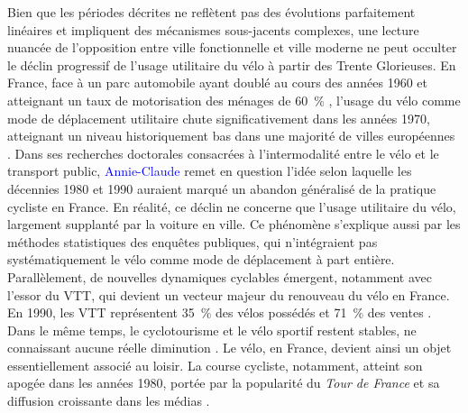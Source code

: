 \begin{refsegment}
Bien que les périodes décrites ne reflètent pas des évolutions parfaitement linéaires et impliquent des mécanismes sous-jacents complexes, une lecture nuancée de l’opposition entre ville fonctionnelle et ville moderne ne peut occulter le déclin progressif de l’usage utilitaire du vélo à partir des Trente Glorieuses. En France, face à un parc automobile ayant doublé au cours des années 1960 et atteignant un taux de motorisation des ménages de 60~\% \textcolor{blue}{\autocite[43]{flonneau_georges_1999}}, l’usage du vélo comme mode de déplacement utilitaire chute significativement dans les années 1970, atteignant un niveau historiquement bas dans une majorité de villes européennes \textcolor{blue}{\autocite[41]{eskenazi_voir_2022}}. Dans ses recherches doctorales consacrées à l’intermodalité entre le vélo et le transport public, \textcolor{blue}{Annie-Claude} \textcolor{blue}{\textcite[53]{sebban_complementarite_2003}} remet en question l’idée selon laquelle les décennies 1980 et 1990 auraient marqué un abandon généralisé de la pratique cycliste en France. En réalité, ce déclin ne concerne que l’usage utilitaire du vélo, largement supplanté par la voiture en ville. Ce phénomène s’explique aussi par les méthodes statistiques des enquêtes publiques, qui n’intégraient pas systématiquement le vélo comme mode de déplacement à part entière. Parallèlement, de nouvelles dynamiques cyclables émergent, notamment avec l’essor du \acrfull{VTT}, qui devient un vecteur majeur du renouveau du vélo en France. En 1990, les \acrshort{VTT} représentent 35~\% des vélos possédés et 71~\% des ventes \textcolor{blue}{\autocite[195]{dauncey_french_2012}}. Dans le même temps, le cyclotourisme et le vélo sportif restent stables, ne connaissant aucune réelle diminution \textcolor{blue}{\autocite[53]{sebban_complementarite_2003}}. Le vélo, en France, devient ainsi un objet essentiellement associé au loisir. La course cycliste, notamment, atteint son apogée dans les années 1980, portée par la popularité du \textsl{Tour de France} et sa diffusion croissante dans les médias \textcolor{blue}{\autocite[196]{dauncey_french_2012}}.%


\end{refsegment}

